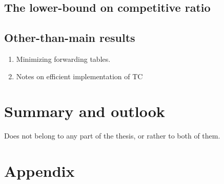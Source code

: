 \documentclass[a4paper]{book}
\begin{document}
\section{The lower-bound on competitive ratio}

\section{Other-than-main results}
\begin{enumerate}
  \item Minimizing forwarding tables.
  \item Notes on efficient implementation of TC
\end{enumerate}

\chapter{Summary and outlook}
Does not belong to any part of the thesis, or rather to both of them.


\chapter{Appendix}



\end{document}
